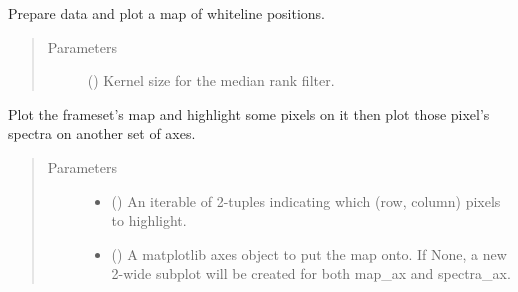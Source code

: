 \documentclass[letterpaper,10pt,english]{sphinxmanual}
\begin{document}
\begin{fulllineitems}
\begin{fulllineitems}
\end{fulllineitems}


\begin{fulllineitems}
\label{\detokenize{xanespy:xanespy.xanes_frameset.XanesFrameset.plot_map}}
Prepare data and plot a map of whiteline positions.
\begin{quote}\begin{description}
\item[{Parameters}] \leavevmode
{} () \textendash{} Kernel size for the median rank filter.

\end{description}\end{quote}

\end{fulllineitems}


\begin{fulllineitems}
\label{\detokenize{xanespy:xanespy.xanes_frameset.XanesFrameset.plot_map_pixel_spectra}}
Plot the frameset’s map and highlight some pixels on it then plot
those pixel’s spectra on another set of axes.
\begin{quote}\begin{description}
\item[{Parameters}] \leavevmode\begin{itemize}
\item {} 
 () \textendash{} An iterable of 2-tuples indicating which (row, column)
pixels to highlight.

\item {} 
 () \textendash{} A matplotlib axes object to put the map onto. If None, a new
2-wide subplot will be created for both map\_ax and
spectra\_ax.


\end{itemize}
\end{description}
\end{quote}
\end{fulllineitems}
\end{fulllineitems}
\end{document}

